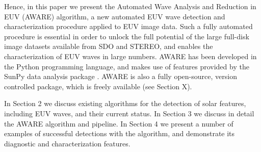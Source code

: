 Hence, in this paper we present the Automated
Wave Analysis and Reduction in EUV (AWARE) algorithm, a new automated
EUV wave detection and characterization procedure applied to EUV image
data. Such a fully automated procedure is essential in order to unlock
the full potential of the large full-disk image datasets available
from SDO and STEREO, and enables the characterization of EUV waves in
large numbers. AWARE has been developed in the Python programming
language, and makes use of features provided by the SunPy data
analysis package \citep{mumford-proc-scipy-2013}. AWARE is also a
fully open-source, version controlled package, which is freely
available (see Section X).


In Section 2 we discuss existing algorithms for the detection of solar
features, including EUV waves, and their current status. In Section 3
we discuss in detail the AWARE algorithm and pipeline. In Section 4 we
present a number of examples of successful detections with the
algorithm, and demonstrate its diagnostic and characterization
features.
